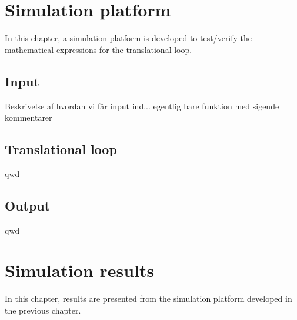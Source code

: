 

\chapter{Simulation platform} \label{ch:intro}
In this chapter, a simulation platform is developed to test/verify the mathematical expressions for the translational loop.

\section{Input}
Beskrivelse af hvordan vi får input ind... egentlig bare funktion med sigende kommentarer

\section{Translational loop}
qwd

\section{Output}
qwd

\chapter{Simulation results} \label{ch:intro}
In this chapter, results are presented from the simulation platform developed in the previous chapter.














